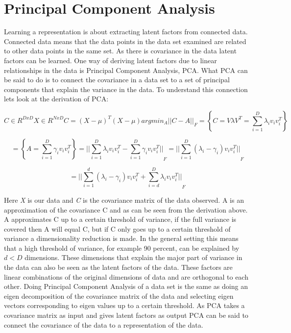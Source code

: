 \documentclass[a4paper,11pt]{kth-mag}
\begin{document}
\section{Principal Component Analysis} 
Learning a representation is about extracting latent factors from connected data. Connected data means that the data points in the data set examined are related to other data points in the same set. As there is covariance in the data latent factors can be learned. One way of deriving latent factors due to linear relationships in the data is Principal Component Analysis, PCA. What PCA can be said to do is to connect the covariance in a data set to a set of principal components that explain the variance in the data. To understand this connection lets look at the derivation of PCA:

\begin{equation}
C \in R^{D x D}
X \in R^{N x D} 
C = (X - \mu)^T (X - \mu)
argmin_A {||C - A||}_F = \left\{C = V \lambda V^T = \sum_{i=1}^{D}\lambda_i v_i v_i^T \right\} 
\end{equation}

\begin{equation}
= \left\{ A = \sum_{i=1}^{D}\gamma_i v_i v_i^T \right\} = {|| \sum_{i=1}^{D}\lambda_i v_i v_i^T - \sum_{i=1}^{D}\gamma_i  v_i v_i^T ||}_F = {|| \sum_{i=1}^{D}(\lambda_i - \gamma_i) v_i v_i^T ||}_F 
\end{equation}

\begin{equation}
= {|| \sum_{i=1}^{d}(\lambda_i - \gamma_i) v_i v_i^T + \sum_{i = d}^{D}\lambda_i v_i v_i^T ||}_F
\end{equation}

Here \textit{X} is our data and \textit{C} is the covariance matrix of the data observed. A is an approximation of the covariance C and as can be seen from the derivation above. A approximates C up to a certain threshold of variance, if the full variance is covered then A will equal C, but if C only goes up to a certain threshold of variance a dimensionality reduction is made. In the general setting this means that a high threshold of variance, for example 90 percent, can be explained by $d < D$ dimensions. These dimensions that explain the major part of variance in the data can also be seen as the latent factors of the data. These factors are linear combinations of the original dimensions of data and are orthogonal to each other. Doing Principal Component Analysis of a data set is the same as doing an eigen decomposition of the covariance matrix of the data and selecting eigen vectors corresponding to eigen values up to a certain threshold. As PCA takes a covariance matrix as input and gives latent factors as output PCA can be said to connect the covariance of the data to a representation of the data.
\end{document}
